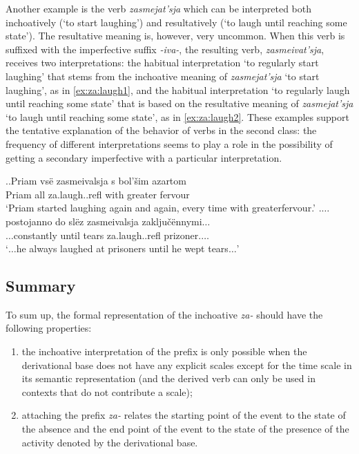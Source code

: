 Another example is the verb \textit{zasmejat'sja} which can be interpreted both inchoatively (`to start laughing') and resultatively (`to laugh until reaching some state'). The resultative meaning is, however, very uncommon. When this verb is suffixed with the imperfective suffix \textit{-iva-}, the resulting verb, \textit{zasmeivat'sja}, receives two interpretations: the habitual interpretation `to regularly start laughing' that stems from the inchoative meaning of \textit{zasmejat'sja} `to start laughing', as in \ref{ex:za:laugh1}, and the habitual interpretation `to regularly laugh until reaching some state' that is based on the resultative meaning of \textit{zasmejat'sja} `to laugh until reaching some state', as in \ref{ex:za:laugh2}. These examples support the tentative explanation of the behavior of verbs in the second class: the frequency of different interpretations seems to play a role in the possibility of getting a secondary imperfective with a particular interpretation.

\ex.\label{ex:za:laugh}\ag.\label{ex:za:laugh1}Priam vs\"{e} zasmeivalsja s bol'\v{s}im azartom\\
Priam all za.laugh..refl with greater fervour\\
\trans `Priam started laughing again and again, every time with greater\linebreak fervour.'
\bg.\label{ex:za:laugh2}$\ldots$postojanno do sl\"{e}z zasmeivalsja zaklju\v{c}\"{e}nnymi$\ldots$\\
$\ldots$constantly until tears za.laugh..refl prizoner.$\ldots$\\
\trans `$\ldots$he always laughed at prisoners until he wept tears$\ldots$'


\subsection{Summary}
To sum up, the formal representation of the inchoative \textit{za-} should have the following properties: 
\begin{enumerate}
\item the inchoative interpretation of the prefix is only possible when the derivational base does not have any explicit scales except for the time scale in its semantic representation (and the derived verb can only be used in contexts that do not contribute a scale);
\item attaching the prefix \textit{za-} relates the starting point of the event to the state of the absence and the end point of the event to the state of the presence of the activity denoted by the derivational base.
\end{enumerate}

